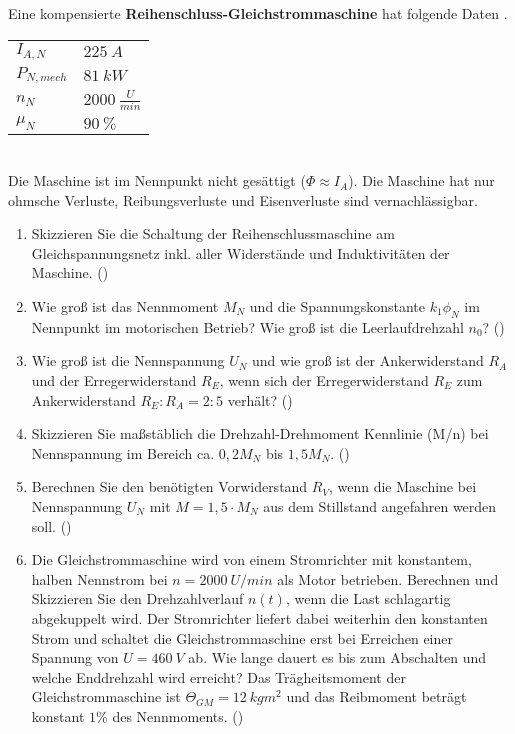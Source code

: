 \begin{question}[topic=gsm,name={21.2.2017},type=exam,tags={20170221}]
	Eine kompensierte \textbf{Reihenschluss-Gleichstrommaschine} hat folgende Daten .
	\begin{tabular}{L{2cm}l}
		$I_{A,N}$ \dotfill &$225~A$\\
		$P_{N,mech}$ \dotfill & $81~kW$ \\
		$n_N$ \dotfill & $2000~\frac{U}{min}$\\
		$\mu_{N}$ \dotfill & $90~\%$\\
	\end{tabular}\\
	Die Maschine ist im Nennpunkt nicht gesättigt ($\Phi \approx I_A$). Die Maschine hat nur ohmsche Verluste, Reibungsverluste und Eisenverluste sind vernachlässigbar.
	\begin{enumerate}
		\item Skizzieren Sie die Schaltung der Reihenschlussmaschine am Gleichspannungsnetz inkl. aller Widerstände und Induktivitäten der Maschine. ()
		\item Wie groß ist das Nennmoment $M_N$ und die Spannungskonstante $k_1 \phi_N$ im Nennpunkt im motorischen Betrieb? Wie groß ist die Leerlaufdrehzahl $n_0$? ()
		\item Wie groß ist die Nennspannung $U_N$ und wie groß ist der Ankerwiderstand $R_A$ und der Erregerwiderstand $R_E$, wenn sich der Erregerwiderstand $R_E$ zum Ankerwiderstand $R_E:R_A = 2:5$ verhält? ()
		\item Skizzieren Sie maßstäblich die Drehzahl-Drehmoment Kennlinie (M/n) bei Nennspannung im Bereich ca. $0,2 M_N$ bis $1,5 M_N$. ()
		\item Berechnen Sie den benötigten Vorwiderstand $R_V$, wenn die Maschine bei Nennspannung $U_N$ mit $M=1,5 \cdot M_N$ aus dem Stillstand angefahren werden soll. ()
		\item Die Gleichstrommaschine wird von einem Stromrichter mit konstantem, halben Nennstrom bei $n=2000~U/min$ als Motor betrieben. Berechnen und Skizzieren Sie den Drehzahlverlauf $n(t)$, wenn die Last schlagartig abgekuppelt wird. Der Stromrichter liefert dabei weiterhin den konstanten Strom und schaltet die Gleichstrommaschine erst bei Erreichen einer Spannung von $U=460~V$ ab. Wie lange dauert es bis zum Abschalten und welche Enddrehzahl wird erreicht? Das Trägheitsmoment der Gleichstrommaschine ist $\Theta_{GM} = 12~kgm^2$ und das Reibmoment beträgt konstant $1 \%$ des Nennmoments. ()
	\end{enumerate}
\end{question}
\begin{solution}
	
\end{solution}